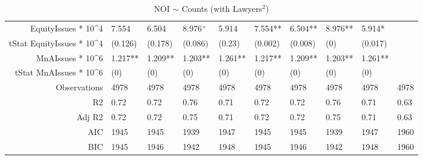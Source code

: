 \begin{table}[ht]
\begin{tabular}{rlllllllll}
  EquityIssues * 10^4 & 7.554 & 6.504 & 8.976$^{+}$ & 5.914 & 7.554** & 6.504** & 8.976** & 5.914* &  \\ 
  tStat EquityIssues * 10^4 & (0.126) & (0.178) & (0.086) & (0.23) & (0.002) & (0.008) & (0) & (0.017) &  \\ 
  MnAIssues * 10^6 & 1.217** & 1.209** & 1.203** & 1.261** & 1.217** & 1.209** & 1.203** & 1.261** &  \\ 
  tStat MnAIssues * 10^6 & (0) & (0) & (0) & (0) & (0) & (0) & (0) & (0) &  \\ 
  Observations & 4978 & 4978 & 4978 & 4978 & 4978 & 4978 & 4978 & 4978 & 4978 \\ 
  R2 & 0.72 & 0.72 & 0.76 & 0.71 & 0.72 & 0.72 & 0.76 & 0.71 & 0.63 \\ 
  Adj R2 & 0.72 & 0.72 & 0.75 & 0.71 & 0.72 & 0.72 & 0.75 & 0.71 & 0.63 \\ 
  AIC & 1945 & 1945 & 1939 & 1947 & 1945 & 1945 & 1939 & 1947 & 1960 \\ 
  BIC & 1945 & 1946 & 1942 & 1948 & 1945 & 1946 & 1942 & 1948 & 1960 \\ 
   \hline
\end{tabular}
\caption{NOI $\sim$ Counts (with Lawyers$^2$)} 
\end{table}
